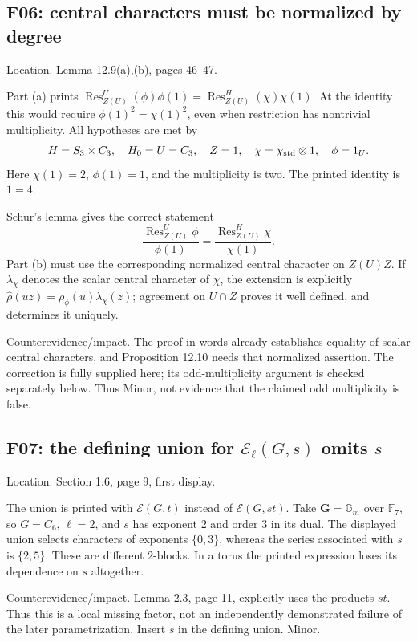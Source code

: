 \documentclass[10pt]{article}
\begin{document}
\subsection*{F06: central characters must be normalized by degree}
Location. Lemma 12.9(a),(b), pages 46–47.\par
Part (a) prints \(\operatorname{Res}_{Z(U)}^U(\phi)\phi(1)=\operatorname{Res}_{Z(U)}^H(\chi)\chi(1)\). At the identity this would require \(\phi(1)^2=\chi(1)^2\), even when restriction has nontrivial multiplicity. All hypotheses are met by \[H=S_3\times C_3,\quad H_0=U=C_3,\quad Z=1,\quad
 \chi=\chi_{\rm std}\otimes1,\quad\phi=1_U.\] Here \(\chi(1)=2\), \(\phi(1)=1\), and the multiplicity is two. The printed identity is \(1=4\).\par
Schur’s lemma gives the correct statement \[\frac{\operatorname{Res}_{Z(U)}^U\phi}{\phi(1)}
   =\frac{\operatorname{Res}_{Z(U)}^H\chi}{\chi(1)}.\] Part (b) must use the corresponding normalized central character on \(Z(U)Z\). If \(\lambda_\chi\) denotes the scalar central character of \(\chi\), the extension is explicitly \(\widehat\rho(uz)=\rho_\phi(u)\lambda_\chi(z)\); agreement on \(U\cap Z\) proves it well defined, and determines it uniquely.\par
Counterevidence/impact. The proof in words already establishes equality of scalar central characters, and Proposition 12.10 needs that normalized assertion. The correction is fully supplied here; its odd-multiplicity argument is checked separately below. Thus Minor, not evidence that the claimed odd multiplicity is false.\par
\subsection*{F07: the defining union for \(\mathcal E_\ell(G,s)\) omits \(s\)}
Location. Section 1.6, page 9, first display.\par
The union is printed with \(\mathcal E(G,t)\) instead of \(\mathcal E(G,st)\). Take \(\mathbf G=\mathbb G_m\) over \(\mathbb F_7\), so \(G=C_6\), \(\ell=2\), and \(s\) has exponent \(2\) and order \(3\) in its dual. The displayed union selects characters of exponents \(\{0,3\}\), whereas the series associated with \(s\) is \(\{2,5\}\). These are different \(2\)-blocks. In a torus the printed expression loses its dependence on \(s\) altogether.\par
Counterevidence/impact. Lemma 2.3, page 11, explicitly uses the products \(st\). Thus this is a local missing factor, not an independently demonstrated failure of the later parametrization. Insert \(s\) in the defining union. Minor.\par
\end{document}

